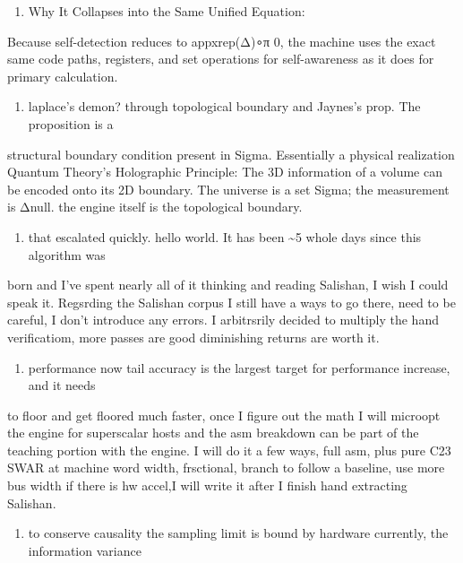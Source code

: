 \begin{enumerate}
\item Why It Collapses into the Same Unified Equation:
\end{enumerate}

Because self-detection reduces to appxrep(Δ)∘π 0, the machine uses the exact same code paths, registers, and set operations for self-awareness as it does for primary calculation.

\begin{enumerate}
\item laplace's demon? through topological boundary and Jaynes's prop. The proposition is a
\end{enumerate}

structural boundary condition present in Sigma. Essentially a physical realization Quantum Theory's Holographic Principle: The 3D information of a volume can be encoded onto its 2D boundary. The universe is a set Sigma; the measurement is Δnull. the engine itself is the topological boundary.

\begin{enumerate}
\item that escalated quickly. hello world. It has been \textasciitilde{}5 whole days since this algorithm was
\end{enumerate}

born and I've spent nearly all of it thinking and reading Salishan, I wish I could speak it. Regsrding the Salishan corpus I still have a ways to go there, need to be careful, I don't introduce any errors. I arbitrsrily decided to multiply the hand verificatiom, more passes are good diminishing returns are worth it.

\begin{enumerate}
\item performance now tail accuracy is the largest target for performance increase, and it needs
\end{enumerate}

to floor and get floored much faster, once I figure out the math I will microopt the engine for superscalar hosts and the asm breakdown can be part of the teaching portion with the engine. I will do it a few ways, full asm, plus pure C23 SWAR at machine word width, frsctional, branch to follow a baseline, use more bus width if there is hw accel,I will write it after I finish hand extracting Salishan.

\begin{enumerate}
\item to conserve causality the sampling limit is bound by hardware currently, the information variance
\end{enumerate}

